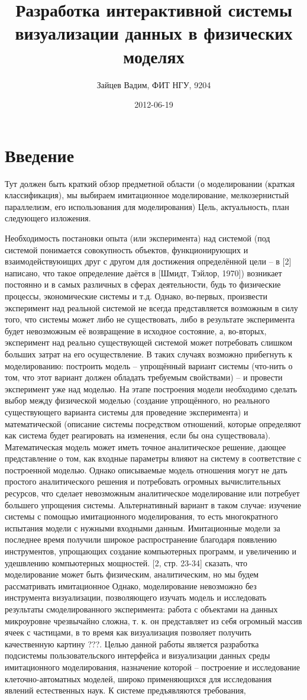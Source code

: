 \documentclass[a4paper,12pt]{extarticle}
\date{2012-06-19}
\title{Разработка интерактивной системы визуализации данных в физических моделях}
\author{Зайцев Вадим, ФИТ НГУ, 9204}
\let\stdsection\section
\renewcommand\section{
    \newpage
    \stdsection
}
\begin{document}
\section{Введение}
\label{sec:intro}
Тут должен быть краткий обзор предметной области (о моделировании (краткая классификация), мы выбираем имитационное моделирование, мелкозернистый параллелизм, его использования для моделирования)
Цель, актуальность, план следующего изложения.

Необходимость постановки опыта (или эксперимента) над системой (под системой понимается совокупность объектов, функционирующих и взаимодействуюищих друг с другом для достижения определённой цели – в [2] написано, что такое определение даётся в [Шмидт, Тэйлор, 1970]) возникает постоянно и в самых различных в сферах деятельности, будь то физические процессы, экономические системы и т.д. Однако, во-первых, произвести эксперимент над реальной системой не всегда представляется возможным в силу того, что системы может либо не существовать, либо в результате эксперимента будет невозможным её возвращение в исходное состояние, а, во-вторых, эксперимент над реально существующей системой может потребовать слишком больших затрат на его осуществление. В таких случаях возможно прибегнуть к моделированию: построить модель – упрощённый вариант системы (что-нить о том, что этот вариант должен обладать требуемым свойствами) – и провести эксперимент уже над моделью. На этапе построения модели необходимо сделать выбор между физической моделью (создание упрощённого, но реального существующего варианта системы для проведение эксперимента) и математической (описание системы посредством отношений, которые определяют как система будет реагировать на изменения, если бы она существовала). Математическая модель может иметь точное аналитическое решение, дающее представление о том, как входные параметры влияют на систему в соответствие с построенной моделью. Однако описываемые модель отношения могут не дать простого аналитического решения и потребовать огромных вычислительных ресурсов, что сделает невозможным аналитическое моделирование или потребует большего упрощения системы. Альтернативный вариант в таком случае: изучение системы с помощью имитационного моделирования, то есть многократного испытания модели с нужными входными данным. Имитационные модели за последнее время получили широкое распространение благодаря появлению инструментов, упрощающих создание компьютерных программ, и увеличению и удешвлению компьютерных мощностей.  [2, стр. 23-34]
сказать, что моделирование может быть физическим, аналитическим, но мы будем рассматривать имитационное
Однако, моделирование невозможно без инструмента визуализации, позволяющего изучать модель и исследовать результаты смоделированного эксперимента: работа с объектами на данных микроуровне чрезвычайно сложна, т. к. он представляет из себя огромный массив ячеек с частицами, в то время как визуализация позволяет получить качественную картину ???. Целью данной работы является разработка подсистемы пользовательского интерфейса и визуализации данных среды имитационного моделирования, назначение которой – построение и исследование клеточно-автоматных моделей, широко применяющихся для исследования явлений естественных наук. К системе предъявляются требования, 
\end{document}
